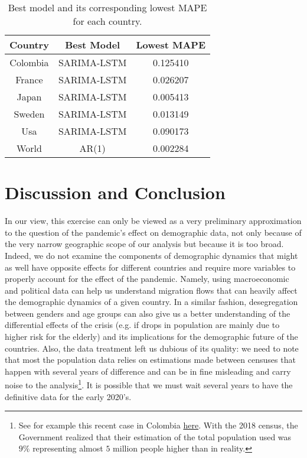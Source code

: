 \documentclass[hidelinks,11pts]{article}
\DeclareMathOperator{\1}{\mathbbm{1}}
\begin{document}
\begin{table}[h]
\centering
\begin{tabular}{|c|c|c|}
\hline
\textbf{Country} & \textbf{Best Model} & \textbf{Lowest MAPE} \\
\hline
Colombia & SARIMA-LSTM & 0.125410 \\
France & SARIMA-LSTM & 0.026207 \\
Japan & SARIMA-LSTM & 0.005413 \\
Sweden & SARIMA-LSTM & 0.013149 \\
Usa & SARIMA-LSTM & 0.090173 \\
World & AR(1) & 0.002284 \\
\hline
\end{tabular}
\caption{Best model and its corresponding lowest MAPE for each country.}
\label{tab:3}
\end{table}


\newpage


\section{Discussion and Conclusion}
In our view, this exercise can only be viewed as a very preliminary approximation to the question of the pandemic's effect on demographic data, not only because of the very narrow geographic scope of our analysis but because it is too broad. 
Indeed, we do not examine the components of demographic dynamics that might as well have opposite effects for different countries and require more variables to properly account for the effect of the pandemic. 
Namely, using macroeconomic and political data can help us understand migration flows that can heavily affect the demographic dynamics of a given country. 
In a similar fashion, desegregation between genders and age groups can also give us a better understanding of the differential effects of the crisis (e.g. if drops in population are mainly due to higher risk for the elderly) and its implications for the demographic future of the countries. 
Also, the data treatment left us dubious of its quality: we need to note that most the population data relies on estimations made between censuses that happen with several years of difference and can be in fine misleading and carry noise to the analysis\footnote{See for example this recent case in Colombia \hyperlink{https://www.bbc.com/mundo/noticias-america-latina-46146957}{here}. With the 2018 census, the Government realized that their estimation of the total population used was $9\%$ representing almost $5$ million people higher than in reality.}. It is possible that we must wait several years to have the definitive data for the early 2020's.
\end{document}
